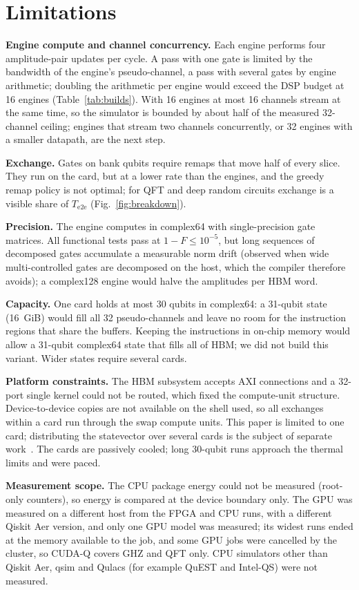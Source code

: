 \section{Limitations}\label{sec:limitations}

\textbf{Engine compute and channel concurrency.} Each engine performs four amplitude-pair updates per cycle. A pass with one gate is limited by the bandwidth of the engine's pseudo-channel, a pass with several gates by engine arithmetic; doubling the arithmetic per engine would exceed the DSP budget at 16 engines (Table~\ref{tab:builds}). With 16 engines at most 16 channels stream at the same time, so the simulator is bounded by about half of the measured 32-channel ceiling; engines that stream two channels concurrently, or 32 engines with a smaller datapath, are the next step.

\textbf{Exchange.} Gates on bank qubits require remaps that move half of every slice. They run on the card, but at a lower rate than the engines, and the greedy remap policy is not optimal; for QFT and deep random circuits exchange is a visible share of $T_\mathrm{e2e}$ (Fig.~\ref{fig:breakdown}).

\textbf{Precision.} The engine computes in complex64 with single-precision gate matrices. All functional tests pass at $1-F\leq 10^{-5}$, but long sequences of decomposed gates accumulate a measurable norm drift (observed when wide multi-controlled gates are decomposed on the host, which the compiler therefore avoids); a complex128 engine would halve the amplitudes per HBM word.

\textbf{Capacity.} One card holds at most 30 qubits in complex64: a 31-qubit state (16~GiB) would fill all 32 pseudo-channels and leave no room for the instruction regions that share the buffers. Keeping the instructions in on-chip memory would allow a 31-qubit complex64 state that fills all of HBM; we did not build this variant. Wider states require several cards.

\textbf{Platform constraints.} The HBM subsystem accepts \NumHbmPortConnections{} AXI connections and a 32-port single kernel could not be routed, which fixed the compute-unit structure. Device-to-device copies are not available on the shell used, so all exchanges within a card run through the swap compute units. This paper is limited to one card; distributing the statevector over several cards is the subject of separate work~\cite{ali2026multifpga}. The cards are passively cooled; long 30-qubit runs approach the thermal limits and were paced.

\textbf{Measurement scope.} The CPU package energy could not be measured (root-only counters), so energy is compared at the device boundary only. The GPU was measured on a different host from the FPGA and CPU runs, with a different Qiskit Aer version, and only one GPU model was measured; its widest runs ended at the memory available to the job, and some GPU jobs were cancelled by the cluster, so CUDA-Q covers GHZ and QFT only. CPU simulators other than Qiskit Aer, qsim and Qulacs (for example QuEST and Intel-QS) were not measured.
